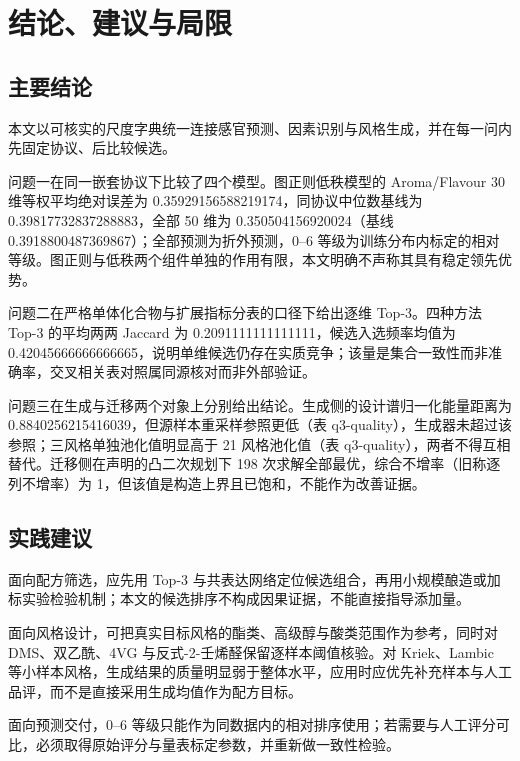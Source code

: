 \documentclass[11pt,a4paper]{article}
\begin{document}
\section{结论、建议与局限}\label{ux7ed3ux8bbaux5efaux8baeux4e0eux5c40ux9650}

\subsection{主要结论}\label{ux4e3bux8981ux7ed3ux8bba}

本文以可核实的尺度字典统一连接感官预测、因素识别与风格生成，并在每一问内先固定协议、后比较候选。

问题一在同一嵌套协议下比较了四个模型。图正则低秩模型的 Aroma/Flavour 30
维等权平均绝对误差为 0.35929156588219174，同协议中位数基线为
0.39817732837288883，全部 50 维为 0.350504156920024（基线
0.3918800487369867）；全部预测为折外预测，0--6
等级为训练分布内标定的相对等级。图正则与低秩两个组件单独的作用有限，本文明确不声称其具有稳定领先优势。

问题二在严格单体化合物与扩展指标分表的口径下给出逐维 Top-3。四种方法
Top-3 的平均两两 Jaccard 为 0.2091111111111111，候选入选频率均值为
0.42045666666666665，说明单维候选仍存在实质竞争；该量是集合一致性而非准确率，交叉相关表对照属同源核对而非外部验证。

问题三在生成与迁移两个对象上分别给出结论。生成侧的设计谱归一化能量距离为
0.8840256215416039，但源样本重采样参照更低（表
q3-quality），生成器未超过该参照；三风格单独池化值明显高于 21
风格池化值（表
q3-quality），两者不得互相替代。迁移侧在声明的凸二次规划下 198
次求解全部最优，综合不增率（旧称逐列不增率）为
1，但该值是构造上界且已饱和，不能作为改善证据。

\subsection{实践建议}\label{ux5b9eux8df5ux5efaux8bae}

面向配方筛选，应先用 Top-3
与共表达网络定位候选组合，再用小规模酿造或加标实验检验机制；本文的候选排序不构成因果证据，不能直接指导添加量。

面向风格设计，可把真实目标风格的酯类、高级醇与酸类范围作为参考，同时对
DMS、双乙酰、4VG 与反式-2-壬烯醛保留逐样本阈值核验。对 Kriek、Lambic
等小样本风格，生成结果的质量明显弱于整体水平，应用时应优先补充样本与人工品评，而不是直接采用生成均值作为配方目标。

面向预测交付，0--6
等级只能作为同数据内的相对排序使用；若需要与人工评分可比，必须取得原始评分与量表标定参数，并重新做一致性检验。
\end{document}
